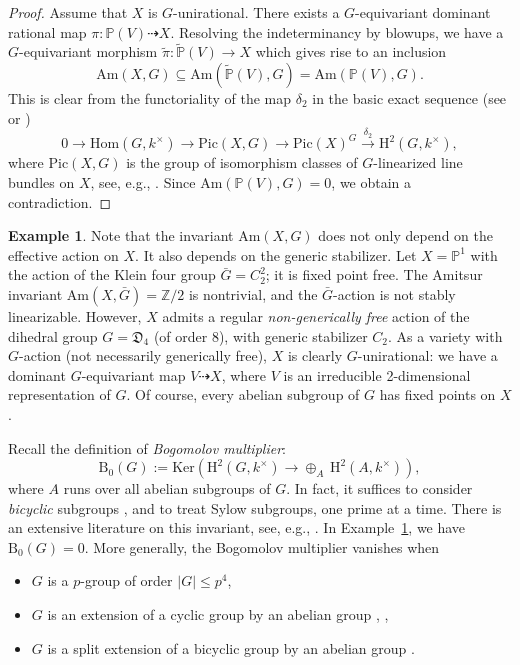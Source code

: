 \documentclass[12pt,reqno]{amsart}
\theoremstyle{plain}
\theoremstyle{remark}
\theoremstyle{definition}
\newtheorem{exam}[prop]{Example}
\numberwithin{equation}{section}
\def\bP{{\mathbb P}}
\def\bZ{{\mathbb Z}}
\def\rH{{\mathrm H}}
\def\Pic{\mathrm{Pic}}
\def\Hom{\mathrm{Hom}}
\def\Ker{\mathrm{Ker}}
\begin{document}
\begin{proof}
Assume that $X$ is $G$-unirational. There exists a $G$-equivariant dominant rational map  $\pi:\bP(V)\dashrightarrow X.$ Resolving the indeterminancy by blowups, we have a $G$-equivariant morphism $\tilde \pi: \widetilde\bP{(V)}\to X$
which
gives rise to an inclusion
\[ \mathrm{Am}(X,G)\subseteq \mathrm{Am}(\widetilde\bP(V),G)=\mathrm{Am}(\bP(V),G). \]
This is clear from the functoriality of the map $\delta_2$ in the basic exact sequence (see \cite{STZ} or \cite[Section 6]{BC-finite})
$$
0\to \Hom(G,k^\times)\to \Pic(X,G)\to \Pic(X)^G\stackrel{\delta_2}{\longrightarrow} \rH^2(G,k^\times),
$$
where $\Pic(X,G)$ is the group of isomorphism classes of $G$-linearized line bundles on $X$,
see, e.g., \cite[Section 3]{KT-Brauer}. Since $\mathrm{Am}(\bP(V),G)=0$, we obtain a contradiction. 
\end{proof}

\begin{exam}
\label{exam:strange}
Note that the invariant $\mathrm{Am}(X,G)$ does not only depend on the effective action on $X$. It also depends on the generic stabilizer. Let $X=\bP^1$ with the action of the Klein four group $\bar{G}=C_2^2$; it is fixed point free. The Amitsur invariant $\mathrm{Am}(X,\bar{G})=\bZ/2$ is nontrivial, and the $\bar{G}$-action is not stably linearizable. However, $X$ admits a regular {\em non-generically free} action of the dihedral group $G=\mathfrak D_4$ (of order 8), with generic stabilizer $C_2$. 
As a variety with $G$-action (not necessarily generically free), $X$ is clearly $G$-unirational: we have a dominant $G$-equivariant map $V\dashrightarrow X$, where $V$ is an irreducible 2-dimensional representation of $G$. Of course,  every abelian subgroup of $G$ has fixed points on $X$. 
\end{exam}









Recall the definition of {\em Bogomolov multiplier}:
$$
\mathrm{B}_0(G):=\Ker\left(\rH^2(G,k^\times)\to \oplus_{A}\,  \rH^2(A,k^\times)\right), 
$$
where $A$ runs over all abelian subgroups of $G$. In fact, it suffices to consider {\em bicyclic} subgroups \cite{Bog-linear}, and to treat Sylow subgroups, one prime at a time. There is an extensive literature on this invariant, see, e.g., \cite[Section 3]{KT-Brauer}. 
In Example~\ref{exam:strange}, we have $\mathrm{B}_0(G)=0$. More generally, the Bogomolov multiplier vanishes when 
\begin{itemize}
\item $G$ is a $p$-group of order $|G|\le p^4$,
    \item $G$ is an extension of a cyclic group by an abelian group \cite[Lemma 4.9]{Bog-linear}, \cite[Lemma 3.1]{KT-Brauer}, 
    \item $G$ is a  split extension of a bicyclic group by an abelian group 
    \cite[Lemma 3.2]{KT-Brauer}.  
\end{itemize}
\end{document}
